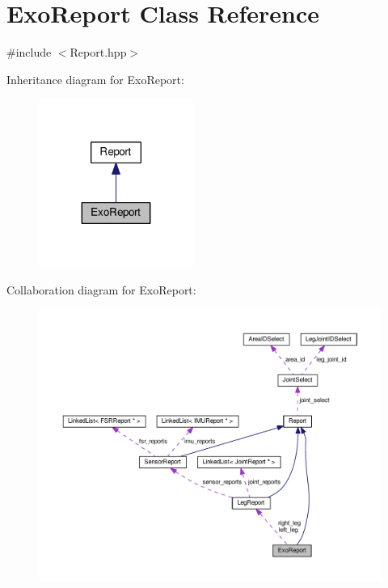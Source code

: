 \hypertarget{classExoReport}{}\section{Exo\+Report Class Reference}
\label{classExoReport}


{\ttfamily \#include $<$Report.\+hpp$>$}



Inheritance diagram for Exo\+Report\+:\nopagebreak
\begin{figure}[H]
\begin{center}
\leavevmode
\includegraphics[width=143pt]{classExoReport__inherit__graph}
\end{center}
\end{figure}


Collaboration diagram for Exo\+Report\+:
\nopagebreak
\begin{figure}[H]
\begin{center}
\leavevmode
\includegraphics[width=350pt]{classExoReport__coll__graph}
\end{center}
\end{figure}
